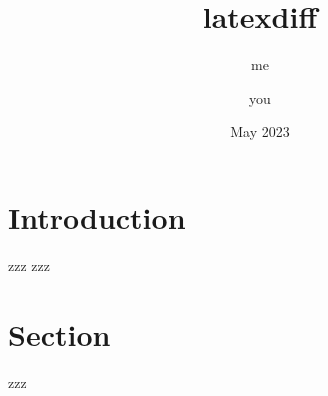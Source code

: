 \documentclass{article}
\title{latexdiff}
\author{me\and you}
\date{May 2023}
\begin{document}
\maketitle

\section{Introduction}
zzz zzz

\section{Section}
zzz
\end{document}
